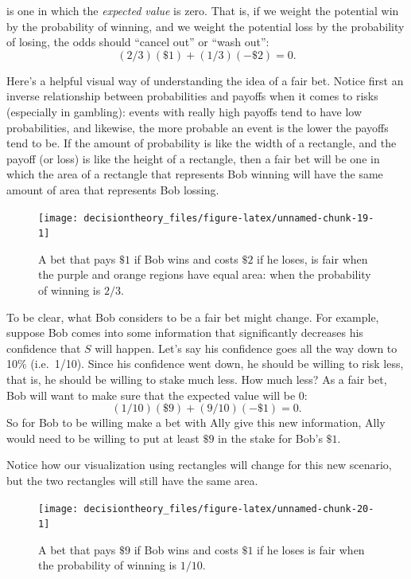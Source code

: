\documentclass[]{tufte-book}
\begin{document}
 is one in which the \emph{expected value} is zero. That is, if we weight the potential win by the probability of winning, and we weight the potential loss by the probability of losing, the odds should ``cancel out'' or ``wash out'': \[ (2/3)(\$1) + (1/3)(-\$2) = 0. \]

Here's a helpful visual way of understanding the idea of a fair bet. Notice first an inverse relationship between probabilities and payoffs when it comes to risks (especially in gambling): events with really high payoffs tend to have low probabilities, and likewise, the more probable an event is the lower the payoffs tend to be. If the amount of probability is like the width of a rectangle, and the payoff (or loss) is like the height of a rectangle, then a fair bet will be one in which the area of a rectangle that represents Bob winning will have the same amount of area that represents Bob lossing.

\begin{figure}
\texttt{[image: decisiontheory\_files/figure-latex/unnamed-chunk-19-1]} \caption[A bet that pays $\$1$ if Bob wins and costs $\$2$ if he loses, is fair when the purple and orange regions have equal area]{A bet that pays $\$1$ if Bob wins and costs $\$2$ if he loses, is fair when the purple and orange regions have equal area: when the probability of winning is $2/3$.}\label{fig:unnamed-chunk-19}
\end{figure}

To be clear, what Bob considers to be a fair bet might change. For example, suppose Bob comes into some information that significantly decreases his confidence that \(S\) will happen. Let's say his confidence goes all the way down to 10\% (i.e.~1/10). Since his confidence went down, he should be willing to risk less, that is, he should be willing to stake much less. How much less? As a fair bet, Bob will want to make sure that the expected value will be 0: \[ (1/10)(\$9) + (9/10)(-\$1) = 0. \] So for Bob to be willing make a bet with Ally give this new information, Ally would need to be willing to put at least \(\$9\) in the stake for Bob's \(\$1\).

Notice how our visualization using rectangles will change for this new scenario, but the two rectangles will still have the same area.

\begin{figure}
\texttt{[image: decisiontheory\_files/figure-latex/unnamed-chunk-20-1]} \caption[A bet that pays $\$9$ if Bob wins and costs $\$1$ if he loses is fair when the probability of winning is $1/10$]{A bet that pays $\$9$ if Bob wins and costs $\$1$ if he loses is fair when the probability of winning is $1/10$.}\label{fig:unnamed-chunk-20}
\end{figure}
\end{document}
